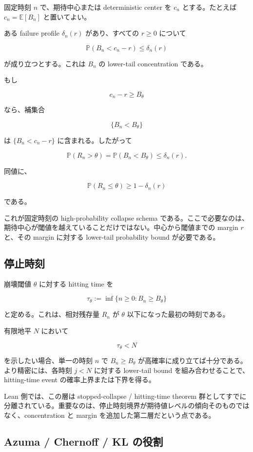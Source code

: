 \documentclass[12pt,a4paper]{article}
\begin{document}
固定時刻 \(n\) で、期待中心または deterministic center を \(c_{n}\) とする。たとえば \(c_{n}=\mathbb E[B_{n}]\) と置いてよい。

ある failure profile \(\delta_{n}(r)\) があり、すべての \(r\ge 0\) について

\[
\mathbb P(B_{n} < c_{n}-r) \le \delta_{n}(r)
\]

が成り立つとする。これは \(B_{n}\) の lower-tail concentration である。

もし

\[
c_{n}-r \ge B_\theta
\]

なら、補集合

\[
\{B_{n} < B_\theta\}
\]

は \(\{B_{n} < c_{n}-r\}\) に含まれる。したがって

\[
\mathbb P(R_{n} > \theta) = \mathbb P(B_{n} < B_\theta) \le \delta_{n}(r).
\]

同値に、

\[
\mathbb P(R_{n} \le \theta) \ge 1-\delta_{n}(r)
\]

である。

これが固定時刻の high-probability collapse schema である。ここで必要なのは、期待中心が閾値を越えていることだけではない。中心から閾値までの margin \(r\) と、その margin に対する lower-tail probability bound が必要である。

\subsection{停止時刻}\label{ux505cux6b62ux6642ux523b}

崩壊閾値 \(\theta\) に対する hitting time を

\[
\tau_\theta := \inf\{n \ge 0 : B_{n} \ge B_\theta\}
\]

と定める。これは、相対残存量 \(R_{n}\) が \(\theta\) 以下になった最初の時刻である。

有限地平 \(N\) において

\[
\tau_\theta < N
\]

を示したい場合、単一の時刻 \(n\) で \(B_{n}\ge B_\theta\) が高確率に成り立てば十分である。より精密には、各時刻 \(j<N\) に対する lower-tail bound を組み合わせることで、hitting-time event の確率上界または下界を得る。

Lean 側では、この層は stopped-collapse / hitting-time theorem 群としてすでに分離されている。重要なのは、停止時刻境界が期待値レベルの傾向そのものではなく、concentration と margin を追加した第二層だという点である。

\subsection{Azuma / Chernoff / KL の役割}\label{azuma-chernoff-kl-ux306eux5f79ux5272}
\end{document}
